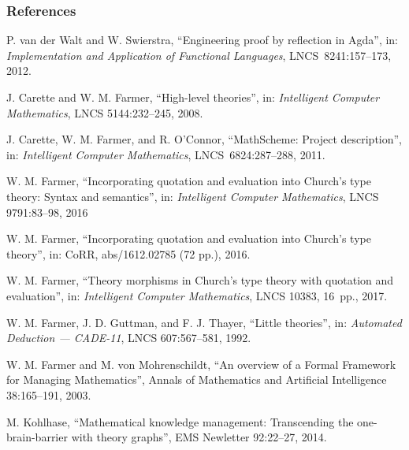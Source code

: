 \documentclass[t,12pt,numbers,fleqn]{beamer}
\begin{document}

\begin{frame}\label{lastframe}
\frametitle{References}
\scriptsize
\bi

  \item \bbrown{[WS12]} P. van der Walt and W. Swierstra,
    ``Engineering proof by reflection in Agda'', in:
    \emph{Implementation and Application of Functional Languages},
    LNCS~8241:157--173, 2012.

  \item \bbrown{[CF08]} J. Carette and W. M. Farmer, ``High-level
    theories'', in: \emph{Intelligent Computer Mathematics}, LNCS
    5144:232--245, 2008.

  \item \bbrown{[CFO11]} J. Carette, W. M. Farmer, and R. O'Connor,
    ``MathScheme: Project description'', in: \emph{Intelligent
    Computer Mathematics}, LNCS~6824:287--288, 2011.

  \item \bbrown{[Far16]} W. M. Farmer, ``Incorporating quotation and
    evaluation into Church's type theory: Syntax and semantics'', in:
    \emph{Intelligent Computer Mathematics}, LNCS 9791:83--98, 2016

  \item \bbrown{[Far16a]} W. M. Farmer, ``Incorporating quotation and
    evaluation into Church's type theory'', in: CoRR, abs/1612.02785
    (72 pp.), 2016.

  \item \bbrown{[Far17]} W. M. Farmer, ``Theory morphisms in Church's
    type theory with quotation and evaluation'', in: \emph{Intelligent
      Computer Mathematics}, LNCS 10383, 16~pp., 2017.

  \item \bbrown{[FGT92]} W. M. Farmer, J. D. Guttman, and
    F. J. Thayer, ``Little theories'', in: \emph{Automated Deduction
      --- CADE-11}, LNCS 607:567--581, 1992.

  \item \bbrown{[FM03]} W. M. Farmer and M. von Mohrenschildt, ``An
    overview of a Formal Framework for Managing Mathematics'', Annals
    of Mathematics and Artificial Intelligence 38:165--191, 2003.

  \item \bbrown{[Kol14]} M. Kohlhase, ``Mathematical knowledge
    management: Transcending the one-brain-barrier with theory
    graphs'', EMS Newletter 92:22--27, 2014.

\ei
\end{frame}


\iffalse

\begin{frame}
\frametitle{}
\bi

  \item 

\ei
\end{frame}

\fi
\end{document}
